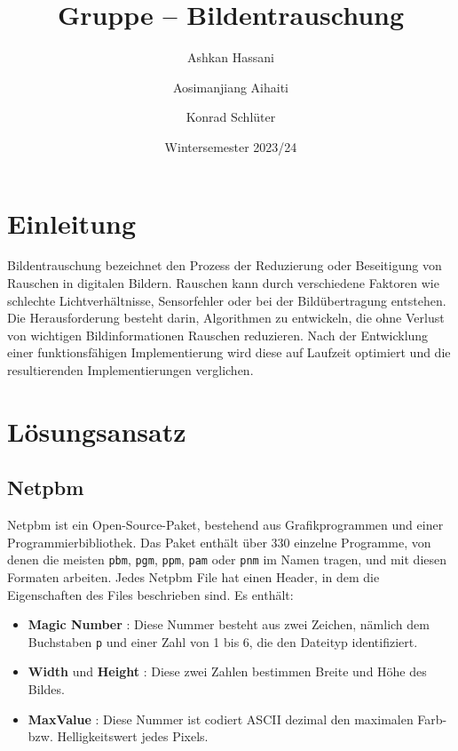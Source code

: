 \documentclass[course=erap]{aspdoc}
\author{Ashkan Hassani \and Aosimanjiang Aihaiti \and Konrad Schlüter}
\date{Wintersemester 2023/24} %
\title{Gruppe \theGroup{} -- Bildentrauschung \theNumber}
\begin{document}
\maketitle

\section{Einleitung}
Bildentrauschung bezeichnet den Prozess der Reduzierung oder Beseitigung von Rauschen in digitalen Bildern. 
Rauschen kann durch verschiedene Faktoren wie schlechte Lichtverhältnisse, Sensorfehler oder bei der Bildübertragung entstehen. 
Die Herausforderung besteht darin, Algorithmen zu entwickeln, die ohne Verlust von wichtigen Bildinformationen Rauschen reduzieren. Nach der Entwicklung einer funktionsfähigen Implementierung wird diese auf Laufzeit optimiert und die resultierenden Implementierungen verglichen.


\section{Lösungsansatz}

\subsection{Netpbm}
Netpbm ist ein Open-Source-Paket, bestehend aus Grafikprogrammen und einer Programmierbibliothek. Das Paket enthält über 330 einzelne Programme, von denen die meisten \texttt{pbm}, \texttt{pgm}, \texttt{ppm}, \texttt{pam} oder \texttt{pnm} im Namen tragen, und mit diesen Formaten arbeiten.
Jedes Netpbm File hat einen Header, in dem die Eigenschaften des Files beschrieben sind\cite{netpbm}. Es enthält:
\begin{itemize}
    \item \textbf{Magic Number} : Diese Nummer besteht aus zwei Zeichen, nämlich dem Buchstaben \texttt{p} und einer Zahl von 1 bis 6, die den Dateityp identifiziert. 
    \item \textbf{Width} und \textbf{Height} : Diese zwei Zahlen bestimmen Breite und Höhe des Bildes. 
    \item \textbf{MaxValue} : Diese Nummer ist codiert ASCII dezimal den maximalen Farb- bzw. Helligkeitswert jedes Pixels.
\end{itemize} 
\end{document}
